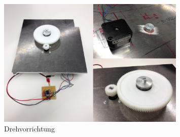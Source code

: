 \begin{figure}[h!]          
	\centering             
	\includegraphics[width=0.8\textwidth]{fig/Drehvorrichtung.png}    
	\caption{Drehvorrichtung}
	
	\label{fig:Drehvorrichtung}
\end{figure}
\noindent



